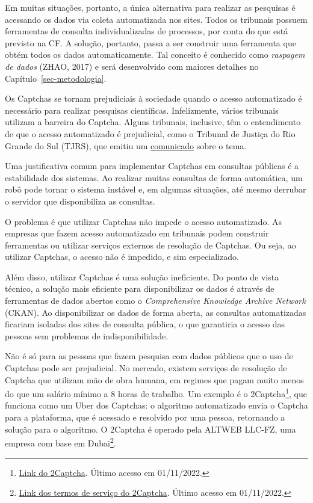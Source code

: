 \documentclass[12pt,twoside,brazilian]{book}
\begin{document}
Em muitas situações, portanto, a única alternativa para realizar as
pesquisas é acessando os dados via coleta automatizada nos sites. Todos
os tribunais possuem ferramentas de consulta individualizadas de
processos, por conta do que está previsto na CF. A solução, portanto,
passa a ser construir uma ferramenta que obtém todos os dados
automaticamente. Tal conceito é conhecido como \emph{raspagem de dados}
(ZHAO, 2017) e será desenvolvido com maiores detalhes no
Capítulo~\ref{sec-metodologia}.

Os Captchas se tornam prejudiciais à sociedade quando o acesso
automatizado é necessário para realizar pesquisas científicas.
Infelizmente, vários tribunais utilizam a barreira do Captcha. Alguns
tribunais, inclusive, têm o entendimento de que o acesso automatizado é
prejudicial, como o Tribunal de Justiça do Rio Grande do Sul (TJRS), que
emitiu um
\href{https://www.tjrs.jus.br/novo/processos-e-servicos/processo-eletronico/acesso-robotizado-a-dados-publicos-e-duplamente-arriscado/}{comunicado}
sobre o tema.

Uma justificativa comum para implementar Captchas em consultas públicas
é a estabilidade dos sistemas. Ao realizar muitas consultas de forma
automática, um robô pode tornar o sistema instável e, em algumas
situações, até mesmo derrubar o servidor que disponibiliza as consultas.

O problema é que utilizar Captchas não impede o acesso automatizado. As
empresas que fazem acesso automatizado em tribunais podem construir
ferramentas ou utilizar serviços externos de resolução de Captchas. Ou
seja, ao utilizar Captchas, o acesso não é impedido, e sim
especializado.

Além disso, utilizar Captchas é uma solução ineficiente. Do ponto de
vista técnico, a solução mais eficiente para disponibilizar os dados é
através de ferramentas de dados abertos como o \emph{Comprehensive
Knowledge Archive Network} (CKAN). Ao disponibilizar os dados de forma
aberta, as consultas automatizadas ficariam isoladas dos sites de
consulta pública, o que garantiria o acesso das pessoas sem problemas de
indisponibilidade.

Não é só para as pessoas que fazem pesquisa com dados públicos que o uso
de Captchas pode ser prejudicial. No mercado, existem serviços de
resolução de Captcha que utilizam mão de obra humana, em regimes que
pagam muito menos do que um salário mínimo a 8 horas de trabalho. Um
exemplo é o 2Captcha\footnote{\href{https://2captcha.com/make-money-online}{Link
  do 2Captcha}. Último acesso em 01/11/2022.}, que funciona como um Uber
dos Captchas: o algoritmo automatizado envia o Captcha para a
plataforma, que é acessado e resolvido por uma pessoa, retornando a
solução para o algoritmo. O 2Captcha é operado pela ALTWEB LLC-FZ, uma
empresa com base em Dubai\footnote{\href{https://2captcha.com/terms-of-service}{Link
  dos termos de serviço do 2Captcha}. Último acesso em 01/11/2022.}.
\end{document}
